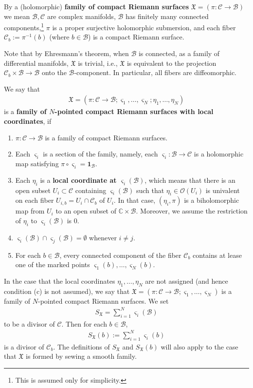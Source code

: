 \documentclass[11pt,b5paper,notitlepage]{article}
\theoremstyle{definition}
\theoremstyle{plain}
\newcommand{\fk}{\mathfrak}
\newcommand{\mc}{\mathcal}
\newcommand{\id}{\mathbf{1}}
\newcommand{\scr}{\mathscr}
\newcommand{\sgm}{\varsigma}
\newcommand{\SX}{S_{\fk X}}
\newcommand{\blt}{\bullet}
\newcommand{\Cbb}{\mathbb C}
\numberwithin{equation}{section}
\begin{document}
By  a (holomorphic) \textbf{family of compact Riemann surfaces} $\fk X=(\pi:\mc C\rightarrow\mc B)$ we mean $\mc B,\mc C$ are complex manifolds, $\mc B$ has finitely many connected components,\footnote{This is assumed only for simplicity.} $\pi$ is a proper surjective holomorphic submersion, and each fiber $\mc C_b:=\pi^{-1}(b)$ \index{Cb@$\mc C_b=\pi^{-1}(b)$} (where $b\in\mc B$) is a compact Riemann surface.

Note that by Ehresmann's theorem, when $\mc B$ is connected,  as a family of differential manifolds, $\fk X$  is trivial, i.e., $\fk X$ is equivalent to the projection $\mc C_b\times\mc B\rightarrow\mc B$ onto the $\mc B$-component. In particular, all fibers are diffeomorphic.



We say that
\begin{align*}
\fk X=(\pi:\mc C\rightarrow\mc B;\sgm_1,\dots,\sgm_N;\eta_1,\dots,\eta_N)
\end{align*}
is a \textbf{family of $N$-pointed compact Riemann surfaces with local coordinates}, if 
\begin{enumerate}[label=(\alph*)]
\item $\pi:\mc C\rightarrow\mc B$ is a family of compact Riemann surfaces.
\item Each $\sgm_i$ is a section of the family, namely, each $\sgm_i:\mc B\rightarrow\mc C$ is a holomorphic map satisfying $\pi\circ\sgm_i=\id_{\mc B}$.
\item Each $\eta_i$ is a \textbf{local coordinate at $\sgm_i(\mc B)$}, which means that there is an open subset $U_i\subset\mc C$ containing $\sgm_i(\mc B)$ such that $\eta_i\in\scr O(U_i)$ is univalent on each fiber $U_{i,b}=U_i\cap\mc C_b$ of $U_i$. In that case, $(\eta_i,\pi)$ is a biholomorphic map from $U_i$ to an open subset of $\Cbb\times\mc B$. Moreover, we assume the restriction of $\eta_i$ to $\sgm_i(\mc B)$ is $0$.
\item $\sgm_i(\mc B)\cap\sgm_j(\mc B)=\emptyset$ whenever $i\neq j$.
\item For each $b\in\mc B$, every connected component of the fiber $\mc C_b$ contains at lease one of the marked points $\sgm_1(b),\dots,\sgm_N(b)$.
\end{enumerate}
In the case that the local coordinates $\eta_1,\dots,\eta_N$ are not assigned (and hence condition (c) is not assumed), we say that $\fk X=(\pi:\mc C\rightarrow\mc B;\sgm_1,\dots,\sgm_N)$ is a family of $N$-pointed compact Riemann surfaces. \index{SX@$k\SX,\blt\SX$} We set
\begin{align*}
\SX=\sum_{i=1}^N\sgm_i(\mc B)
\end{align*}
to be a divisor of $\mc C$. Then for each $b\in\mc B$,
\begin{align*}
\SX(b):=\sum_{i=1}^N\sgm_i(b)
\end{align*}
is a divisor of $\mc C_b$. The definitions of $\SX$ and $\SX(b)$ will also apply to the case that $\fk X$ is formed by sewing a smooth family.
\end{document}

